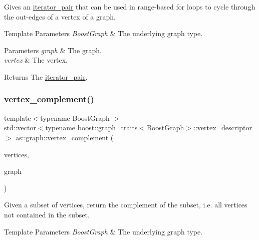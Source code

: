Gives an \hyperlink{classas_1_1iterator__pair}{iterator\+\_\+pair} that can be used in range-\/based for loops to cycle through the out-\/edges of a vertex of a graph. 


\begin{DoxyTemplParams}{Template Parameters}
{\em Boost\+Graph} & The underlying graph type. \\
\hline
\end{DoxyTemplParams}

\begin{DoxyParams}{Parameters}
{\em graph} & The graph. \\
\hline
{\em vertex} & The vertex. \\
\hline
\end{DoxyParams}
\begin{DoxyReturn}{Returns}
The \hyperlink{classas_1_1iterator__pair}{iterator\+\_\+pair}. 
\end{DoxyReturn}
\mbox{\label{namespaceas_1_1graph_aec6bce35a79299f552d227442f399580}} 
\subsubsection{\texorpdfstring{vertex\+\_\+complement()}{vertex\_complement()}}
{\footnotesize\ttfamily template$<$typename Boost\+Graph $>$ \\
std\+::vector$<$typename boost\+::graph\+\_\+traits$<$Boost\+Graph$>$\+::vertex\+\_\+descriptor$>$ as\+::graph\+::vertex\+\_\+complement (\begin{DoxyParamCaption}\item[{std\+::vector$<$ typename boost\+::graph\+\_\+traits$<$ Boost\+Graph $>$\+::vertex\+\_\+descriptor $>$}]{vertices,  }\item[{const Boost\+Graph \&}]{graph }\end{DoxyParamCaption})\hspace{0.3cm}{\ttfamily [inline]}}



Given a subset of vertices, return the complement of the subset, i.\+e. all vertices not contained in the subset. 


\begin{DoxyTemplParams}{Template Parameters}
{\em Boost\+Graph} & The underlying graph type. \\
\hline
\end{DoxyTemplParams}

